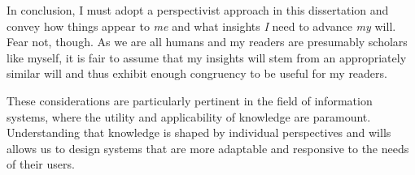 In conclusion, I must adopt a perspectivist approach in this dissertation and convey how things appear to \textit{me} and what insights \textit{I} need to advance \textit{my} will. Fear not, though. As we are all humans and my readers are presumably scholars like myself, it is fair to assume that my insights will stem from an appropriately similar will and thus exhibit enough congruency to be useful for my readers.

These considerations are particularly pertinent in the field of information systems, where the utility and applicability of knowledge are paramount. Understanding that knowledge is shaped by individual perspectives and wills allows us to design systems that are more adaptable and responsive to the needs of their users.